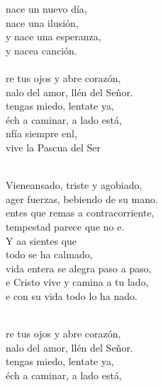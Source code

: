 \begin{cancion}%
	\begin{chorus}%
	 nace un nuevo día,\\
	 nace una ilusión,\\
	y nace una esperanza,\\
	y nacea canción.\\
\jump\\
	re tus ojos y abre  corazón,\\
	nalo del amor, llén del Señor. \\
	 tengas miedo, lentate ya, \\
	éch a caminar, a lado está,\\
	nfía siempre enl, \\
	vive la Pascua del Ser \\
	\end{chorus}%
	\jump\\
	Vieneansado, triste y agobiado,\\
	ager fuerzas, bebiendo de su mano.\\
	entes que remas a contracorriente,\\
	 tempestad parece que no e.\\
	Y aa sientes que\\
todo se ha calmado,\\
	vida entera se alegra paso a paso,\\
	e Cristo vive y camina a tu lado,\\
	e con su vida todo lo ha nado.\\\jump\\
	\begin{chorus}%
	re tus ojos y abre  corazón,\\
	nalo del amor, llén del Señor. \\
	 tengas miedo, lentate ya, \\
	éch a caminar, a lado está,\\

\end{chorus}
\end{cancion}
